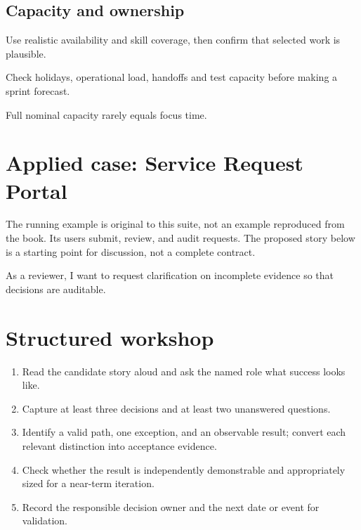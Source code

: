 \documentclass[11pt,letterpaper]{article}
\begin{document}
\subsection{Capacity and ownership}
Use realistic availability and skill coverage, then confirm that selected work is plausible.

\begin{tcolorbox}[colback=tealback,colframe=navy,title={Engineering translation},breakable]
Check holidays, operational load, handoffs and test capacity before making a sprint forecast.

\end{tcolorbox}
\begin{tcolorbox}[colback=amberback,colframe=navy,title={Failure mode to watch},breakable]
Full nominal capacity rarely equals focus time.

\end{tcolorbox}
\section{Applied case: Service Request Portal}
The running example is original to this suite, not an example reproduced from the book. Its users submit, review, and audit requests. The proposed story below is a starting point for discussion, not a complete contract.

\begin{tcolorbox}[colback=blueback,colframe=navy,title={Candidate story},breakable]
As a reviewer, I want to request clarification on incomplete evidence so that decisions are auditable.

\end{tcolorbox}
\section{Structured workshop}
\begin{enumerate}[leftmargin=*,itemsep=3pt]
\item Read the candidate story aloud and ask the named role what success looks like.
\item Capture at least three decisions and at least two unanswered questions.
\item Identify a valid path, one exception, and an observable result; convert each relevant distinction into acceptance evidence.
\item Check whether the result is independently demonstrable and appropriately sized for a near-term iteration.
\item Record the responsible decision owner and the next date or event for validation.
\end{enumerate}
\end{document}
